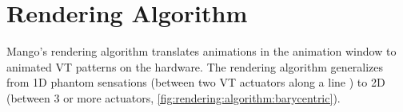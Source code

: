 %
%
\section{Rendering Algorithm}
Mango's rendering algorithm translates animations in the animation window to animated VT patterns on the hardware.
The rendering algorithm
generalizes from 1D phantom sensations (between two VT actuators along a line \cite{Seo2010,Alles1970,Israr2011a}) to 2D (between 3 or more actuators, \autoref{fig:rendering:algorithm:barycentric}).
%

